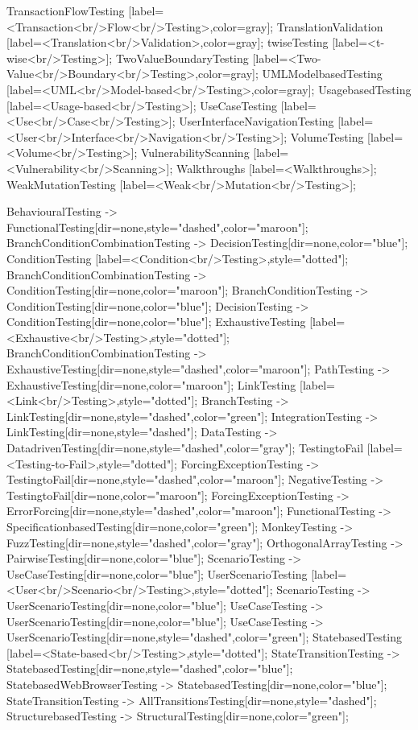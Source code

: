 \documentclass{article}
\begin{document}
{TransactionFlowTesting [label=<Transaction<br/>Flow<br/>Testing>,color=gray];
TranslationValidation [label=<Translation<br/>Validation>,color=gray];
twiseTesting [label=<t-wise<br/>Testing>];
TwoValueBoundaryTesting [label=<Two-Value<br/>Boundary<br/>Testing>,color=gray];
UMLModelbasedTesting [label=<UML<br/>Model-based<br/>Testing>,color=gray];
UsagebasedTesting [label=<Usage-based<br/>Testing>];
UseCaseTesting [label=<Use<br/>Case<br/>Testing>];
UserInterfaceNavigationTesting [label=<User<br/>Interface<br/>Navigation<br/>Testing>];
VolumeTesting [label=<Volume<br/>Testing>];
VulnerabilityScanning [label=<Vulnerability<br/>Scanning>];
Walkthroughs [label=<Walkthroughs>];
WeakMutationTesting [label=<Weak<br/>Mutation<br/>Testing>];

BehaviouralTesting -> FunctionalTesting[dir=none,style="dashed",color="maroon"];
BranchConditionCombinationTesting -> DecisionTesting[dir=none,color="blue"];
ConditionTesting [label=<Condition<br/>Testing>,style="dotted"];
BranchConditionCombinationTesting -> ConditionTesting[dir=none,color="maroon"];
BranchConditionTesting -> ConditionTesting[dir=none,color="blue"];
DecisionTesting -> ConditionTesting[dir=none,color="blue"];
ExhaustiveTesting [label=<Exhaustive<br/>Testing>,style="dotted"];
BranchConditionCombinationTesting -> ExhaustiveTesting[dir=none,style="dashed",color="maroon"];
PathTesting -> ExhaustiveTesting[dir=none,color="maroon"];
LinkTesting [label=<Link<br/>Testing>,style="dotted"];
BranchTesting -> LinkTesting[dir=none,style="dashed",color="green"];
IntegrationTesting -> LinkTesting[dir=none,style="dashed"];
DataTesting -> DatadrivenTesting[dir=none,style="dashed",color="gray"];
TestingtoFail [label=<Testing-to-Fail>,style="dotted"];
ForcingExceptionTesting -> TestingtoFail[dir=none,style="dashed",color="maroon"];
NegativeTesting -> TestingtoFail[dir=none,color="maroon"];
ForcingExceptionTesting -> ErrorForcing[dir=none,style="dashed",color="maroon"];
FunctionalTesting -> SpecificationbasedTesting[dir=none,color="green"];
MonkeyTesting -> FuzzTesting[dir=none,style="dashed",color="gray"];
OrthogonalArrayTesting -> PairwiseTesting[dir=none,color="blue"];
ScenarioTesting -> UseCaseTesting[dir=none,color="blue"];
UserScenarioTesting [label=<User<br/>Scenario<br/>Testing>,style="dotted"];
ScenarioTesting -> UserScenarioTesting[dir=none,color="blue"];
UseCaseTesting -> UserScenarioTesting[dir=none,color="blue"];
UseCaseTesting -> UserScenarioTesting[dir=none,style="dashed",color="green"];
StatebasedTesting [label=<State-based<br/>Testing>,style="dotted"];
StateTransitionTesting -> StatebasedTesting[dir=none,style="dashed",color="blue"];
StatebasedWebBrowserTesting -> StatebasedTesting[dir=none,color="blue"];
StateTransitionTesting -> AllTransitionsTesting[dir=none,style="dashed"];
StructurebasedTesting -> StructuralTesting[dir=none,color="green"];

}
\end{document}
